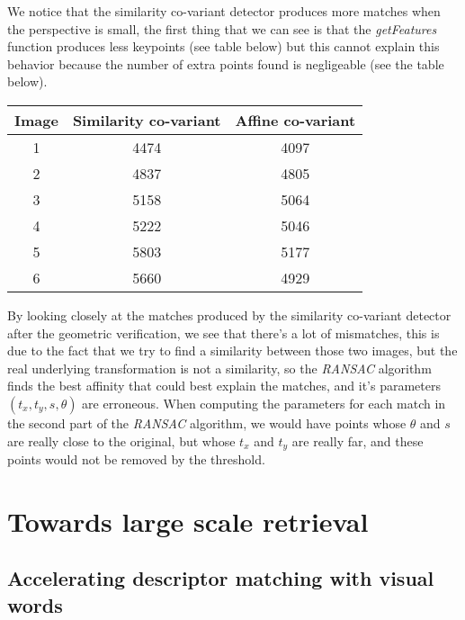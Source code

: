 \documentclass{article}
\begin{document}

We notice that the similarity co-variant detector produces more matches
when the perspective is small, the first thing that we can see is that
the \emph{getFeatures} function produces less keypoints (see table below)
but this cannot explain this behavior because the number of extra points
found is negligeable (see the table below).

\begin{center}
  \begin{tabular}{| c | c | c |}
    \hline
    Image & Similarity co-variant & Affine co-variant \\
    \hline
    1 & 4474 & 4097 \\
    2 & 4837 & 4805 \\
    3 & 5158 & 5064 \\
    4 & 5222 & 5046 \\
    5 & 5803 & 5177 \\
    6 & 5660 & 4929 \\
    \hline
  \end{tabular}
\end{center}

By looking closely at the matches produced by the similarity
co-variant detector after the geometric verification, we see that
there's a lot of mismatches, this is due to the fact that we try to
find a similarity between those two images, but the real underlying
transformation is not a similarity, so the \emph{RANSAC} algorithm
finds the best affinity that could best explain the matches, and it's
parameters $(t_x, t_y, s, \theta)$ are erroneous. When
computing the parameters for each match in the second part of the
\emph{RANSAC} algorithm, we would have points whose $\theta$ and $s$
are really close to the original, but whose $t_x$ and $t_y$ are
really far, and these points would not be removed by the threshold.


\section{Towards large scale retrieval}

\subsection{Accelerating descriptor matching with visual words}
\end{document}
